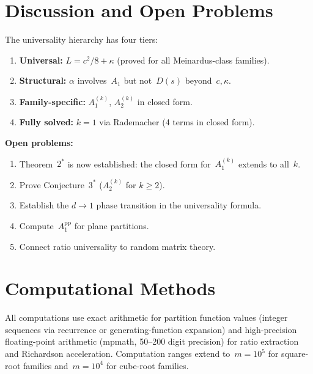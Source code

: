 \documentclass[11pt,a4paper]{article}
\begin{document}
\section{Discussion and Open Problems}\label{sec:discussion}

The universality hierarchy has four tiers:
\begin{enumerate}
  \item \textbf{Universal:} $L = c^2/8 + \kappa$ (proved for all Meinardus-class families).
  \item \textbf{Structural:} $\alpha$ involves~$A_1$ but not~$D(s)$ beyond~$c, \kappa$.
  \item \textbf{Family-specific:} $A_1^{(k)}$, $A_2^{(k)}$ in closed form.
  \item \textbf{Fully solved:} $k=1$ via Rademacher (4 terms in closed form).
\end{enumerate}

\noindent\textbf{Open problems:}
\begin{enumerate}
  \item Theorem~$2^*$ is now established: the closed form for~$A_1^{(k)}$ extends to all~$k$.
  \item Prove Conjecture~$3^*$ ($A_2^{(k)}$ for $k \geq 2$).
  \item Establish the $d \to 1$ phase transition in the universality formula.
  \item Compute~$A_1^{\mathrm{pp}}$ for plane partitions.
  \item Connect ratio universality to random matrix theory.
\end{enumerate}

\section{Computational Methods}\label{sec:computation}

All computations use exact arithmetic for partition function values (integer sequences via recurrence or generating-function expansion) and high-precision floating-point arithmetic (mpmath, 50--200 digit precision) for ratio extraction and Richardson acceleration. Computation ranges extend to~$m = 10^5$ for square-root families and~$m = 10^4$ for cube-root families.
\end{document}
